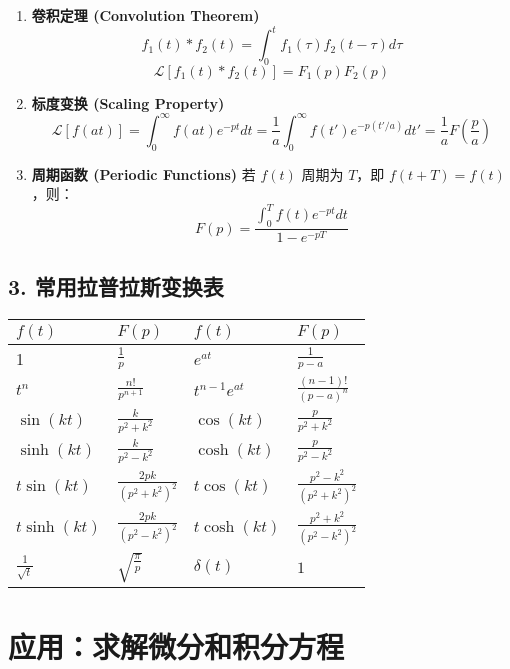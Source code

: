 \documentclass{article}
\begin{document}
\begin{enumerate}
		\item \textbf{卷积定理 (Convolution Theorem)}
		$$ f_1(t) * f_2(t) = \int_0^t f_1(\tau) f_2(t-\tau) d\tau $$
		$$ \mathcal{L}[f_1(t) * f_2(t)] = F_1(p)F_2(p) $$
		
		\item \textbf{标度变换 (Scaling Property)}
		$$ \mathcal{L}[f(at)] = \int_0^\infty f(at) e^{-pt} dt = \frac{1}{a} \int_0^\infty f(t') e^{-p(t'/a)} dt' = \frac{1}{a}F\left(\frac{p}{a}\right) $$
		
		\item \textbf{周期函数 (Periodic Functions)}
		若 $f(t)$ 周期为 $T$，即 $f(t+T)=f(t)$，则：
		$$ F(p) = \frac{\int_0^T f(t) e^{-pt} dt}{1-e^{-pT}} $$
	\end{enumerate}
	
	\subsection*{3. 常用拉普拉斯变换表}
	\begin{tabular}{ll|ll}
		$f(t)$           & $F(p)$                             & $f(t)$             & $F(p)$                               \\
		\hline
		1                & $\frac{1}{p}$                      & $e^{at}$           & $\frac{1}{p-a}$                      \\
		$t^n$            & $\frac{n!}{p^{n+1}}$               & $t^{n-1}e^{at}$    & $\frac{(n-1)!}{(p-a)^n}$             \\
		$\sin(kt)$       & $\frac{k}{p^2+k^2}$                & $\cos(kt)$         & $\frac{p}{p^2+k^2}$                  \\
		$\sinh(kt)$      & $\frac{k}{p^2-k^2}$                & $\cosh(kt)$        & $\frac{p}{p^2-k^2}$                  \\
		$t\sin(kt)$      & $\frac{2pk}{(p^2+k^2)^2}$          & $t\cos(kt)$        & $\frac{p^2-k^2}{(p^2+k^2)^2}$        \\
		$t\sinh(kt)$     & $\frac{2pk}{(p^2-k^2)^2}$          & $t\cosh(kt)$       & $\frac{p^2+k^2}{(p^2-k^2)^2}$        \\
		$\frac{1}{\sqrt{t}}$ & $\sqrt{\frac{\pi}{p}}$         & $\delta(t)$        & $1$                                  \\
	\end{tabular}
	
	\section*{应用：求解微分和积分方程}
	
\end{document}
